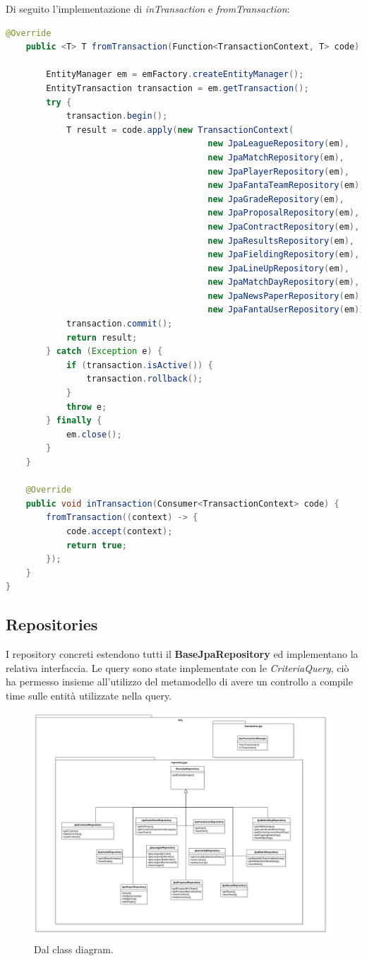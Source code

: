 Di seguito l'implementazione di \textit{inTransaction} e \textit{fromTransaction}:
\begin{lstlisting}[language=Java]
@Override
	public <T> T fromTransaction(Function<TransactionContext, T> code) {

		EntityManager em = emFactory.createEntityManager();
		EntityTransaction transaction = em.getTransaction();
		try {
			transaction.begin();
			T result = code.apply(new TransactionContext(
										new JpaLeagueRepository(em), 
										new JpaMatchRepository(em),
										new JpaPlayerRepository(em), 
										new JpaFantaTeamRepository(em), 
										new JpaGradeRepository(em),
										new JpaProposalRepository(em), 
										new JpaContractRepository(em), 
										new JpaResultsRepository(em),
										new JpaFieldingRepository(em), 
										new JpaLineUpRepository(em), 
										new JpaMatchDayRepository(em),
										new JpaNewsPaperRepository(em), 
										new JpaFantaUserRepository(em)));
			transaction.commit();
			return result;
		} catch (Exception e) {
			if (transaction.isActive()) {
				transaction.rollback();
			}
			throw e;
		} finally {
			em.close();
		}
	}

	@Override
	public void inTransaction(Consumer<TransactionContext> code) {
		fromTransaction((context) -> {
			code.accept(context);
			return true;
		});
	}
}
\end{lstlisting}
\newpage

\subsection{Repositories}
I repository concreti estendono tutti il \textbf{BaseJpaRepository} ed implementano la relativa interfaccia.
Le query sono state implementate con le \textit{CriteriaQuery}, ciò ha permesso insieme
all'utilizzo del metamodello di avere un controllo a compile time sulle entità utilizzate nella query.

\begin{figure}
    \centering
    \includegraphics[width=\textwidth]{Resources/graficiUML/DALClassDiagram.png}        
    \caption{Dal class diagram.}
    \label{fig:Dal_class_diagram2}
\end{figure}

